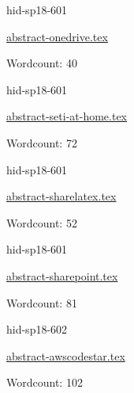 

\begin{IU}

hid-sp18-601

\href{https://github.com/cloudmesh-community/hid-sp18-601/blob/master//technology/abstract-onedrive.tex}{abstract-onedrive.tex}

 

Wordcount: 40

\end{IU}



\begin{IU}

hid-sp18-601

\href{https://github.com/cloudmesh-community/hid-sp18-601/blob/master//technology/abstract-seti-at-home.tex}{abstract-seti-at-home.tex}

 

Wordcount: 72

\end{IU}



\begin{IU}

hid-sp18-601

\href{https://github.com/cloudmesh-community/hid-sp18-601/blob/master//technology/abstract-sharelatex.tex}{abstract-sharelatex.tex}

 

Wordcount: 52

\end{IU}



\begin{IU}

hid-sp18-601

\href{https://github.com/cloudmesh-community/hid-sp18-601/blob/master//technology/abstract-sharepoint.tex}{abstract-sharepoint.tex}

 

Wordcount: 81

\end{IU}



\begin{IU}

hid-sp18-602

\href{https://github.com/cloudmesh-community/hid-sp18-602/blob/master//technology/abstract-awscodestar.tex}{abstract-awscodestar.tex}

 

Wordcount: 102

\end{IU}

